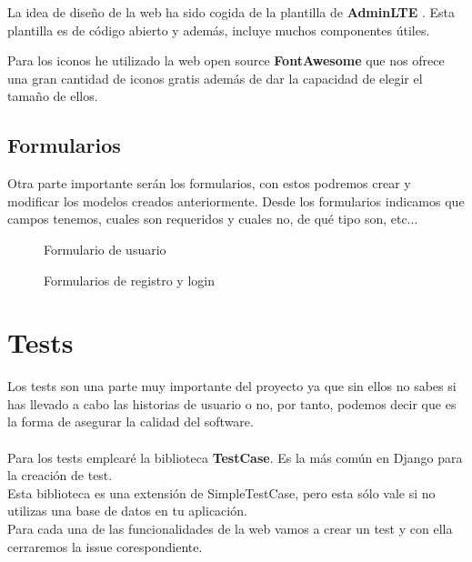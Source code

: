 La idea de diseño de la web ha sido cogida de la plantilla de \textbf{AdminLTE} \cite{adminlte}. Esta plantilla es de código abierto y 
además, incluye muchos componentes útiles.

Para los iconos he utilizado la web open source \textbf{FontAwesome} \cite{iconos} que nos 
ofrece una gran cantidad de iconos gratis además de dar la capacidad de elegir el tamaño de ellos.

\subsection{Formularios}

Otra parte importante serán los formularios, con estos podremos crear y modificar los modelos creados anteriormente.
Desde los formularios indicamos que campos tenemos, cuales son requeridos y cuales no, de qué tipo son, etc...

\begin{figure}[H]
  \centering
  \noindent{}
  \caption{Formulario de usuario}
\end{figure}

\begin{figure}[H]
  \centering
  \noindent{}
  \caption{Formularios de registro y login}
\end{figure}

\newpage
\section{Tests} \label{sec:tests}

Los tests son una parte muy importante del proyecto ya que sin ellos no sabes si has llevado a cabo las historias de usuario o no, por tanto, 
podemos decir que es la forma de asegurar la calidad del software. \\ \\

Para los tests emplearé la biblioteca \textbf{TestCase}. Es la más común en Django para la creación de test.\\
Esta biblioteca es una extensión de SimpleTestCase, pero esta sólo vale si no utilizas una base de datos 
en tu aplicación.\\

Para cada una de las funcionalidades de la web vamos a crear un test y con ella cerraremos la issue corespondiente.

